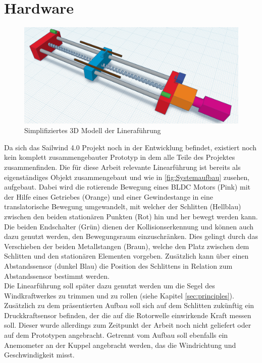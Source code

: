 \newpage
\section{Hardware}
\begin{figure}[H]
	\centering
	\includegraphics[width=1.0\textwidth]{images/Hardware/Linerarfuerhrung_3D_Modell.png}
	\caption{Simplifiziertes 3D Modell der Lineraführung}
	\label{fig:Systemaufbau}
\end{figure}
Da sich das Sailwind 4.0 Projekt noch in der Entwicklung befindet, existiert noch kein komplett zusammengebauter Prototyp in dem alle Teile des Projektes zusammenfinden. Die für diese Arbeit relevante Linearführung ist bereits als eigenständiges Objekt zusammengebaut und wie in \autoref{fig:Systemaufbau} zusehen, aufgebaut. Dabei wird die rotierende Bewegung eines BLDC Motors (Pink) mit der Hilfe eines Getriebes (Orange) und einer Gewindestange in eine translatorische Bewegung umgewandelt, mit welcher der Schlitten (Hellblau) zwischen den beiden stationären Punkten (Rot) hin und her bewegt werden kann. Die beiden Endschalter (Grün) dienen der Kollisionserkennung und können auch dazu genutzt werden, den Bewegungsraum einzuschränken. Dies gelingt durch das Verschieben der beiden Metallstangen (Braun), welche den Platz zwischen dem Schlitten und den stationären Elementen vorgeben. Zusätzlich kann über einen Abstandssensor (dunkel Blau) die Position des Schlittens in Relation zum Abstandssensor bestimmt werden.\\

\noindent Die Linearführung soll später dazu genutzt werden um die Segel des Windkraftwerkes zu trimmen und zu rollen (siehe Kapitel \ref{sec:principles}). Zusätzlich zu dem präsentierten Aufbau soll sich auf dem Schlitten zukünftig ein Druckkraftsensor befinden, der die auf die Rotorwelle einwirkende Kraft messen soll. Dieser wurde allerdings zum Zeitpunkt der Arbeit noch nicht geliefert oder auf dem Prototypen angebracht. Getrennt vom Aufbau soll ebenfalls ein Anemometer an der Kuppel angebracht werden, das die Windrichtung und Geschwindigkeit misst.

